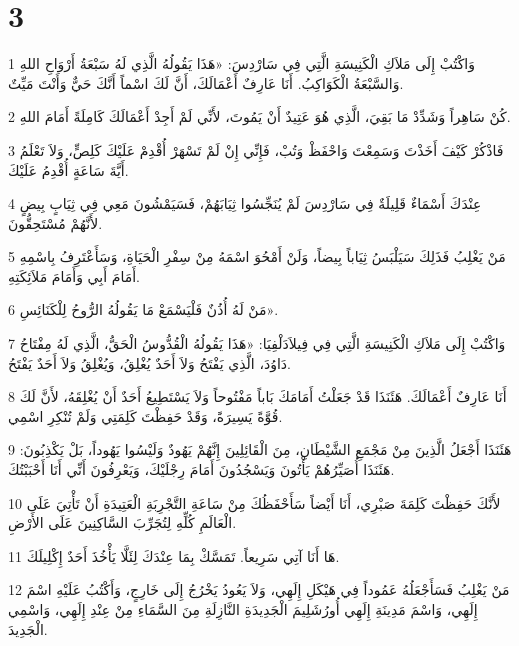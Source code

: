 \chapter{3}

\par 1 وَاكْتُبْ إِلَى مَلاَكِ الْكَنِيسَةِ الَّتِي فِي سَارْدِسَ: «هَذَا يَقُولُهُ الَّذِي لَهُ سَبْعَةُ أَرْوَاحِ اللهِ وَالسَّبْعَةُ الْكَوَاكِبُ. أَنَا عَارِفٌ أَعْمَالَكَ، أَنَّ لَكَ اسْماً أَنَّكَ حَيٌّ وَأَنْتَ مَيِّتٌ.
\par 2 كُنْ سَاهِراً وَشَدِّدْ مَا بَقِيَ، الَّذِي هُوَ عَتِيدٌ أَنْ يَمُوتَ، لأَنِّي لَمْ أَجِدْ أَعْمَالَكَ كَامِلَةً أَمَامَ اللهِ.
\par 3 فَاذْكُرْ كَيْفَ أَخَذْتَ وَسَمِعْتَ وَاحْفَظْ وَتُبْ، فَإِنِّي إِنْ لَمْ تَسْهَرْ أُقْدِمْ عَلَيْكَ كَلِصٍّ، وَلاَ تَعْلَمُ أَيَّةَ سَاعَةٍ أُقْدِمُ عَلَيْكَ.
\par 4 عِنْدَكَ أَسْمَاءٌ قَلِيلَةٌ فِي سَارْدِسَ لَمْ يُنَجِّسُوا ثِيَابَهُمْ، فَسَيَمْشُونَ مَعِي فِي ثِيَابٍ بِيضٍ لأَنَّهُمْ مُسْتَحِقُّونَ.
\par 5 مَنْ يَغْلِبُ فَذَلِكَ سَيَلْبَسُ ثِيَاباً بِيضاً، وَلَنْ أَمْحُوَ اسْمَهُ مِنْ سِفْرِ الْحَيَاةِ، وَسَأَعْتَرِفُ بِاسْمِهِ أَمَامَ أَبِي وَأَمَامَ مَلاَئِكَتِهِ.
\par 6 مَنْ لَهُ أُذُنٌ فَلْيَسْمَعْ مَا يَقُولُهُ الرُّوحُ لِلْكَنَائِسِ».
\par 7 وَاكْتُبْ إِلَى مَلاَكِ الْكَنِيسَةِ الَّتِي فِي فِيلاَدَلْفِيَا: «هَذَا يَقُولُهُ الْقُدُّوسُ الْحَقُّ، الَّذِي لَهُ مِفْتَاحُ دَاوُدَ، الَّذِي يَفْتَحُ وَلاَ أَحَدٌ يُغْلِقُ، وَيُغْلِقُ وَلاَ أَحَدٌ يَفْتَحُ.
\par 8 أَنَا عَارِفٌ أَعْمَالَكَ. هَئَنَذَا قَدْ جَعَلْتُ أَمَامَكَ بَاباً مَفْتُوحاً وَلاَ يَسْتَطِيعُ أَحَدٌ أَنْ يُغْلِقَهُ، لأَنَّ لَكَ قُوَّةً يَسِيرَةً، وَقَدْ حَفِظْتَ كَلِمَتِي وَلَمْ تُنْكِرِ اسْمِي.
\par 9 هَئَنَذَا أَجْعَلُ الَّذِينَ مِنْ مَجْمَعِ الشَّيْطَانِ، مِنَ الْقَائِلِينَ إِنَّهُمْ يَهُودٌ وَلَيْسُوا يَهُوداً، بَلْ يَكْذِبُونَ: هَئَنَذَا أُصَيِّرُهُمْ يَأْتُونَ وَيَسْجُدُونَ أَمَامَ رِجْلَيْكَ، وَيَعْرِفُونَ أَنِّي أَنَا أَحْبَبْتُكَ.
\par 10 لأَنَّكَ حَفِظْتَ كَلِمَةَ صَبْرِي، أَنَا أَيْضاً سَأَحْفَظُكَ مِنْ سَاعَةِ التَّجْرِبَةِ الْعَتِيدَةِ أَنْ تَأْتِيَ عَلَى الْعَالَمِ كُلِّهِ لِتُجَرِّبَ السَّاكِنِينَ عَلَى الأَرْضِ.
\par 11 هَا أَنَا آتِي سَرِيعاً. تَمَسَّكْ بِمَا عِنْدَكَ لِئَلَّا يَأْخُذَ أَحَدٌ إِكْلِيلَكَ.
\par 12 مَنْ يَغْلِبُ فَسَأَجْعَلُهُ عَمُوداً فِي هَيْكَلِ إِلَهِي، وَلاَ يَعُودُ يَخْرُجُ إِلَى خَارِجٍ، وَأَكْتُبُ عَلَيْهِ اسْمَ إِلَهِي، وَاسْمَ مَدِينَةِ إِلَهِي أُورُشَلِيمَ الْجَدِيدَةِ النَّازِلَةِ مِنَ السَّمَاءِ مِنْ عِنْدِ إِلَهِي، وَاسْمِي الْجَدِيدَ.
